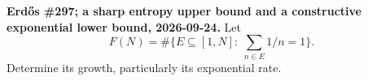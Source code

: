\textbf{Erd\H{o}s \#297; a sharp entropy upper bound and a constructive exponential lower bound, 2026-09-24.}
Let
\[
F(N)=\#\{E\subseteq[1,N]:\ \sum_{n\in E}1/n=1\}.
\]
Determine its growth, particularly its exponential rate.
